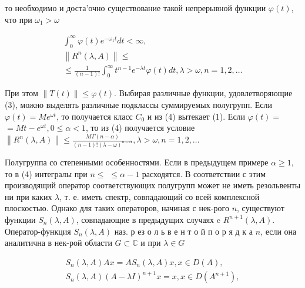 \documentclass[10pt]{article}
\begin{document}
то необходимо и доста'очно существование такой непрерывной функции $\varphi(t)$, что при $\omega_{1}>\omega$



\[

\begin{gathered}

\int_{0}^{\infty} \varphi(t) e^{-\omega_{1} t} d t<\infty, \\

\left\|R^{n}(\lambda, A)\right\| \leqslant \\

\leqslant \frac{1}{(n-1) !} \int_{0}^{\infty} t^{n-1} e^{-\lambda t} \varphi(t) d t, \lambda>\omega, n=1,2, \ldots

\end{gathered}

\]



При этом $\|T(t)\| \leqslant \varphi(t)$. Выбирая различные функции, удовлетворяющие (3), можно выделять различные подклассы суммируемых полугрупп. Если $\varphi(t)=M e^{\omega t}$, то получается класс $C_{0}$ и из (4) вытекает (1). Если $\varphi(t)=$ $=M t-e^{\omega t}, 0 \leqslant \alpha<1$, то из (4) получается условие $\left\|R^{n}(\lambda, A)\right\| \leqslant \frac{M \Gamma(n-\alpha)}{(n-1) !(\lambda-\omega)^{n-\alpha}}, \lambda>\omega, n=1,2, \ldots$



Полугруппа со степенными особенностями. Если в предыдущем примере $\alpha \geqslant 1$, то в (4) интегралы при $n \leqslant$ $\leqslant \alpha-1$ расходятся. В соответствии с этим производящий оператор соответствующих полугрупп может не иметь резольвенты ни при каких $\lambda$, т. е. иметь спектр, совпадающий со всей комплексной плоскостью. Однако для таких операторов, начиная с нек-рого $n$, существуют функции $S_{n}(\lambda, A)$, совпадающие в предыдущих случаях c $R^{n+1}(\lambda, A)$. Оператор-функция $S_{n}(\lambda, A)$ наз. р ез о л ь в е н т о й п о р я д к а $n$, если она аналитична в нек-рой области $G \subset \mathbb{C}$ и при $\lambda \in G$



\[

\begin{gathered}

S_{n}(\lambda, A) A x=A S_{n}(\lambda, A) x, x \in D(A), \\

S_{n}(\lambda, A)(A-\lambda I)^{n+1} x=x, x \in D\left(A^{n+1}\right),

\end{gathered}

\]
\end{document}
